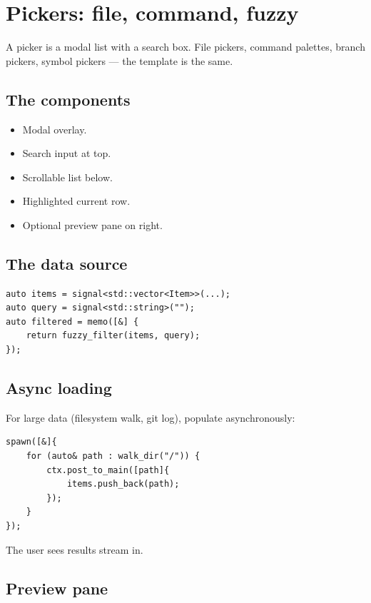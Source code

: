 \chapter{Pickers: file, command, fuzzy}
\label{ch:pickers}

\begin{aside}
A picker is a modal list with a search box. File pickers,
command palettes, branch pickers, symbol pickers --- the
template is the same.
\end{aside}

\section{The components}

\begin{itemize}[leftmargin=*]
  \item Modal overlay.
  \item Search input at top.
  \item Scrollable list below.
  \item Highlighted current row.
  \item Optional preview pane on right.
\end{itemize}

\section{The data source}

\begin{lstlisting}
auto items = signal<std::vector<Item>>(...);
auto query = signal<std::string>("");
auto filtered = memo([&] {
    return fuzzy_filter(items, query);
});
\end{lstlisting}

\section{Async loading}

For large data (filesystem walk, git log), populate
asynchronously:

\begin{lstlisting}
spawn([&]{
    for (auto& path : walk_dir("/")) {
        ctx.post_to_main([path]{
            items.push_back(path);
        });
    }
});
\end{lstlisting}

The user sees results stream in.

\section{Preview pane}

